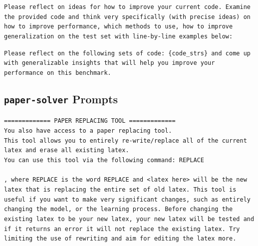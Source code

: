 \documentclass[11pt, a4paper]{gdm_format}
\begin{document}
\begin{tcolorbox}[breakable,colback=orange!5!white, colframe=orange!80!black, title=Reflective Feedback Prompt] \texttt{Please reflect on ideas for how to improve your current code. Examine the provided code and think very specifically (with precise ideas) on how to improve performance, which methods to use, how to improve generalization on the test set with line-by-line examples below:\\} \end{tcolorbox}


\begin{tcolorbox}[breakable,colback=orange!5!white, colframe=orange!80!black, title=Reflective Feedback System Prompt] \texttt{Please reflect on the following sets of code: \{code\_strs\} and come up with generalizable insights that will help you improve your performance on this benchmark.} \end{tcolorbox}





\subsection{\texttt{paper-solver} Prompts}


\begin{tcolorbox}[breakable,colback=orange!5!white, colframe=orange!80!black, title=paper-solve Replacement Tool]
\texttt{============= PAPER REPLACING TOOL =============\\You also have access to a paper replacing tool.\\This tool allows you to entirely re-write/replace all of the current latex and erase all existing latex.\\You can use this tool via the following command: \textasciigrave\textasciigrave\textasciigrave REPLACE\\<latex here>\\\textasciigrave\textasciigrave\textasciigrave, where REPLACE is the word REPLACE and <latex here> will be the new latex that is replacing the entire set of old latex. This tool is useful if you want to make very significant changes, such as entirely changing the model, or the learning process. Before changing the existing latex to be your new latex, your new latex will be tested and if it returns an error it will not replace the existing latex. Try limiting the use of rewriting and aim for editing the latex more.}
\end{tcolorbox}
\end{document}
